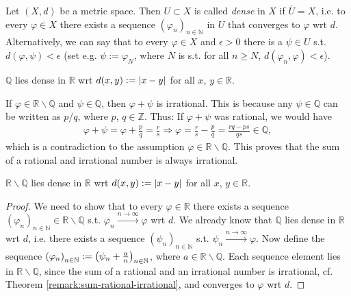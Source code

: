 \begin{defn}
	Let $(X, d)$ be a metric space. Then $U\subset X$ is called \textit{dense} in $X$ if $\overline{U} = X$, i.e. to every $\varphi\in X$ there exists a sequence $\left(\varphi_n\right)_{n\in\mathbb N}$ in $U$ that converges to $\varphi$ wrt $d$. Alternatively, we can say that to every $\varphi\in X$ and $\epsilon > 0$ there is a $\psi\in U$ s.t. $d(\varphi, \psi) < \epsilon$ (set e.g. $\psi := \varphi_N$, where $N$ is s.t. for all $n\geq N$, $d(\varphi_n, \varphi) < \epsilon$).
\end{defn}

\begin{exmp}
	$\mathbb Q$ lies dense in $\mathbb R$ wrt $d(x, y) := \abs{x - y}$ for all $x$, $y\in\mathbb R$.
\end{exmp}

\begin{theorem}\label{remark:sum-rational-irrational}
	If $\varphi\in\mathbb R\backslash \mathbb Q$ and $\psi\in\mathbb Q$, then $\varphi + \psi$ is irrational. This is because any $\psi \in \mathbb Q$ can be written as $p/q$, where $p$, $q\in\mathbb Z$. Thus: If $\varphi + \psi$ was rational, we would have
	\begin{align}
		\varphi + \psi = \varphi + \frac{p}{q} = \frac{r}{s} \Rightarrow \varphi = \frac{r}{s} - \frac{p}{q} = \frac{rq - ps}{qs} \in \mathbb Q,
	\end{align}
	which is a contradiction to the assumption $\varphi\in\mathbb R\backslash\mathbb Q$. This proves that the sum of a rational and irrational number is always irrational.
\end{theorem}

\begin{exmp}
	$\mathbb R\backslash \mathbb Q$ lies dense in $\mathbb R$ wrt $d(x, y) := \abs{x - y}$ for all $x$, $y\in\mathbb R$.
\end{exmp}

\begin{proof}
	We need to show that to every $\varphi\in \mathbb R$ there exists a sequence $\left(\varphi_n\right)_{n\in\mathbb N}\in \mathbb R\backslash \mathbb Q$ s.t. $\varphi_n\overset{n\to\infty}{\longrightarrow}\varphi$ wrt $d$. We already know that $\mathbb Q$ lies dense in $\mathbb R$ wrt $d$, i.e. there exists a sequence $\left(\psi_n\right)_{n\in\mathbb N}$ s.t. $\psi_n\overset{n\to\infty}{\longrightarrow}\varphi$. Now define the sequence $\seq[\varphi_n] := \seq[\psi_n + \frac{a}{n}]$, where $a\in\mathbb R\backslash \mathbb Q$. Each sequence element lies in $\mathbb R\backslash \mathbb Q$, since the sum of a rational and an irrational number is irrational, cf. Theorem \ref{remark:sum-rational-irrational}, and converges to $\varphi$ wrt $d$.
\end{proof}

